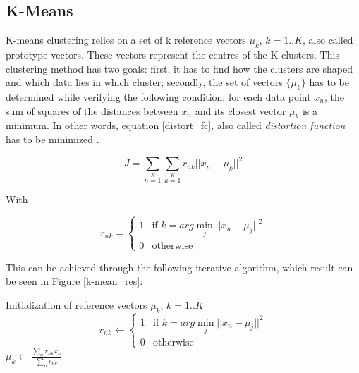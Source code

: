 \subsection{K-Means}

\vspace{\baselineskip}
\noindent K-means clustering relies on a set of k reference vectors $\mu_k$, $k=1..K$, also called prototype vectors. These vectors represent the centres of the K clusters. This clustering method has two goals: first, it has to find how the clusters are shaped and which data lies in which cluster; secondly, the set of vectors $\{\mu_k\}$ has to be determined while verifying the following condition: for each data point $x_n$, the sum of squares of the distances between $x_n$ and its closest vector $\mu_k$ is a minimum. In other words, equation \ref{distort_fc}, also called \textit{distortion function} has to be minimized \cite{BIS06}.

\begin{equation}
J = \sum\limits_{n=1}\limits^{N} \sum\limits_{k=1}\limits^{K} r_{nk} ||x_n - \mu_k||^2
\label{distort_fc}
\end{equation}

\noindent With

\begin{equation*}
r_{nk} = \left\{
	\begin{array}{ll}
		1 & \mbox{if }  k = arg \min_j ||x_n - \mu_j||^2 \\
		0 & \mbox{otherwise}
	\end{array}
\right.
\end{equation*}
\vspace{\baselineskip}

\noindent This can be achieved through the following iterative algorithm, which result can be seen in Figure \ref{k-mean_res}:
\newline

\begin{algorithmic}
\State Initialization of reference vectors $\mu_k$, $k = 1..K$ 
\Repeat	
		\State \begin{equation*} 
				r_{nk} \gets \left\{
				\begin{array}{ll}
					1 & \mbox{if }  k = arg \min_j ||x_n - \mu_j||^2 \\
					0 & \mbox{otherwise}
				\end{array}
				\right.
				\end{equation*}
	\EndFor
		\State $\mu_k \gets \frac{\sum\limits_n r_{nk}x_n}{\sum\limits_n r_{nk}}$
	\EndFor
{}
\end{algorithmic}

